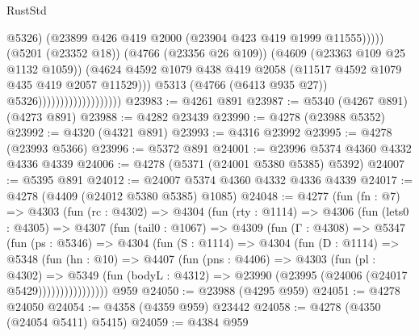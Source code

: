 \begin{lexlean}{RustStd}
\begin{coremodule}
{\begin{coremodule}
{{{{{{{{{{{{{{{{{{{{{{{{{{{{{{{{{{{                                                    @5326)
                                                  (@23899
                                                    @426
                                                    @419
                                                    @2000
                                                    (@23904 @423 @419 @1999 @11555)))))
                                            (@5201 (@23352 @18))
                                            (@4766 (@23356 @26 @109))
                                            (@4609 (@23363 @109 @25 @1132 @1059))
                                            (@4624
                                              @4592
                                              @1079
                                              @438
                                              @419
                                              @2058
                                              (@11517 @4592 @1079 @435 @419 @2057 @11529)))
                                          @5313
                                          (@4766 (@6413 @935 @27))
                                          @5326)))))))))))))))))))
@23983 := @4261 @891
@23987 := @5340 (@4267 @891) (@4273 @891)
@23988 := @4282 @23439
@23990 := @4278 (@23988 @5352)
@23992 := @4320 (@4321 @891)
@23993 := @4316 @23992
@23995 := @4278 (@23993 @5366)
@23996 := @5372 @891
@24001 := @23996 @5374 @4360 @4332 @4336 @4339
@24006 := @4278 (@5371 (@24001 @5380 @5385) @5392)
@24007 := @5395 @891
@24012 := @24007 @5374 @4360 @4332 @4336 @4339
@24017 := @4278 (@4409 (@24012 @5380 @5385) @1085)
@24048 := @4277
    (fun (fn : @7) =>
    @4303
      (fun (rc : @4302) =>
      @4304
        (fun (rty : @1114) =>
        @4306
          (fun (lets0 : @4305) =>
          @4307
            (fun (tail0 : @1067) =>
            @4309
              (fun (Γ : @4308) =>
              @5347
                (fun (ps : @5346) =>
                @4304
                  (fun (S : @1114) =>
                  @4304
                    (fun (D : @1114) =>
                    @5348
                      (fun (hn : @10) =>
                      @4407
                        (fun (pns : @4406) =>
                        @4303
                          (fun (pl : @4302) =>
                          @5349
                            (fun (bodyL : @4312) =>
                            @23990 (@23995 (@24006 (@24017 @5429))))))))))))))))
    @959
@24050 := @23988 (@4295 @959)
@24051 := @4278 @24050
@24054 := @4358 (@4359 @959) @23442
@24058 := @4278 (@4350 (@24054 @5411) @5415)
@24059 := @4384 @959
}}}}}}}}}}}}}}}}}}}}}}}}}}}}}}}}}}}
\end{coremodule}}
\end{coremodule}
\end{lexlean}
